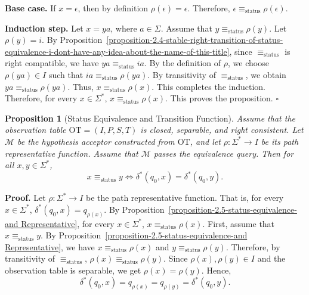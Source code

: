 \documentclass{ieice-tecrep}
\newtheorem{proposition}{Proposition}
\begin{document}
\noindent\textbf{Base case.} If \(x=\epsilon\), then by definition \(\rho(\epsilon)=\epsilon\). Therefore, \(\epsilon\equiv_{\mathrm{status}}\rho(\epsilon)\).

\noindent\textbf{Induction step.} Let \(x=ya\), where \(a\in\Sigma\). Assume that \(y\equiv_{\mathrm{status}}\rho(y)\). Let \(\rho(y)=i\). By Proposition~\ref{proposition-2.4-stable-right-transition-of-status-equivalence-i-dont-have-any-idea-about-the-name-of-this-title}, since \(\equiv_{\mathrm{status}}\) is right
compatible, we have \(ya\equiv_{\mathrm{status}}ia\). By the definition of \(\rho\), we choose \(\rho(ya)\in I\) such that \(ia\equiv_{\mathrm{status}}\rho(ya)\). By transitivity of \(\equiv_{\mathrm{status}}\), we obtain \(ya\equiv_{\mathrm{status}}\rho(ya)\). Thus, \(x\equiv_{\mathrm{status}}\rho(x)\). This completes the induction. Therefore, for every \(x\in\Sigma^*\), \(x\equiv_{\mathrm{status}}\rho(x)\). This proves the proposition.
\hfill $\square$

\begin{proposition}[Status Equivalence and Transition Function]\label{proposition-2.6-status-equivalence-and-transition-function}
Assume that the observation table
\(\mathrm{OT}=(I,P,S,T)\) is closed, separable, and right consistent.
Let \(\mathcal{M}\) be the hypothesis acceptor constructed from \(\mathrm{OT}\),
and let \(\rho:\Sigma^*\to I\) be its path representative function.
Assume that \(\mathcal{M}\) passes the equivalence query. Then for all \(x,y\in\Sigma^*\),
\[
x\equiv_{\mathrm{status}}y
\Longleftrightarrow
\delta^*(q_0,x)=\delta^*(q_0,y).
\]
\end{proposition}
\noindent\textbf{Proof.} Let \(\rho:\Sigma^*\to I\) be the path representative function. That is,
for every \(x\in\Sigma^*\), \(\delta^*(q_0,x)=q_{\rho(x)}\). By Proposition~\ref{proposition-2.5-status-equivalence-and Representative}, for every \(x\in\Sigma^*\), \(x\equiv_{\mathrm{status}}\rho(x)\). First, assume that \(x\equiv_{\mathrm{status}}y\). By Proposition~\ref{proposition-2.5-status-equivalence-and Representative}, we have \(x\equiv_{\mathrm{status}}\rho(x)\) and \(y\equiv_{\mathrm{status}}\rho(y)\). Therefore, by transitivity of \(\equiv_{\mathrm{status}}\), \(\rho(x)\equiv_{\mathrm{status}}\rho(y)\). Since \(\rho(x),\rho(y)\in I\) and the observation table is separable,
we get \(\rho(x)=\rho(y)\). Hence,
\[
\delta^*(q_0,x)=q_{\rho(x)}=q_{\rho(y)}=\delta^*(q_0,y).
\]
\end{document}
